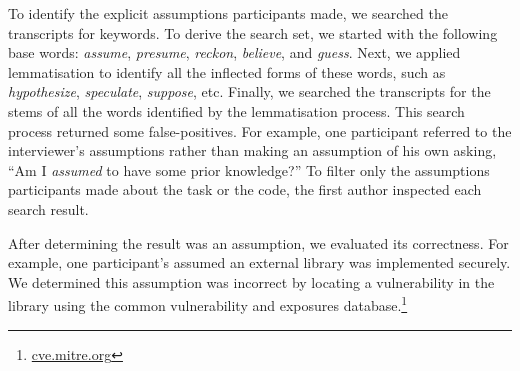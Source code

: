 \documentclass[10pt,journal,compsoc]{IEEEtran}
\begin{document}
%
To identify the explicit assumptions participants made, we searched the transcripts for keywords.
To derive the search set, we started with the following base words: \textit{assume}, \textit{presume}, \textit{reckon}, \textit{believe}, and \textit{guess}.
Next, we applied lemmatisation to identify all the inflected forms of these words, such as \textit{hypothesize}, \textit{speculate}, \textit{suppose}, etc. 
Finally, we searched the transcripts for the stems of all the words identified by the lemmatisation process.
This search process returned some false-positives. 
For example, one participant referred to the interviewer's assumptions rather than making an assumption of his own asking, ``Am I \textit{assumed} to have some prior knowledge?''
To filter only the assumptions participants made about the task or the code, the first author inspected each search result.

After determining the result was an assumption, we evaluated its correctness.
For example, one participant's assumed an external library was implemented securely. 
We determined this assumption was incorrect by locating a vulnerability in the library using the common vulnerability and exposures database.\footnote{\url{cve.mitre.org}}
\end{document}
